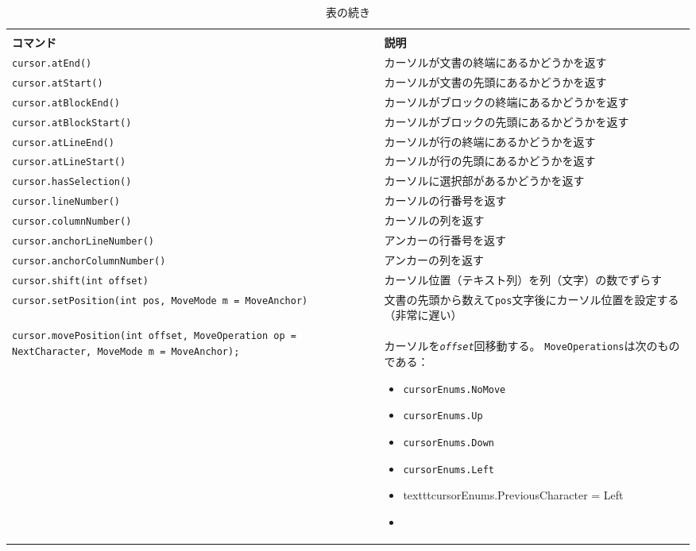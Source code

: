\begin{longtable}{XX}
  \caption{カーソルオブジェクトの一覧}
  \endfirsthead
  \caption{表の続き}
  \endhead
  \hline
  \multicolumn{2}{c}{\textbf{カーソルオブジェクト}}\\
  \textbf{コマンド} & \textbf{説明}\\
  \hline
  \texttt{cursor.atEnd()} & カーソルが文書の終端にあるかどうかを返す\\
  \texttt{cursor.atStart()} & カーソルが文書の先頭にあるかどうかを返す\\
  \texttt{cursor.atBlockEnd()} & カーソルがブロックの終端にあるかどうかを返す\\
  \texttt{cursor.atBlockStart()} & カーソルがブロックの先頭にあるかどうかを返す\\
  \texttt{cursor.atLineEnd()} & カーソルが行の終端にあるかどうかを返す\\
  \texttt{cursor.atLineStart()} & カーソルが行の先頭にあるかどうかを返す\\
  \texttt{cursor.hasSelection()} & カーソルに選択部があるかどうかを返す\\
  \texttt{cursor.lineNumber()} & カーソルの行番号を返す\\
  \texttt{cursor.columnNumber()} & カーソルの列を返す\\
  \texttt{cursor.anchorLineNumber()} & アンカーの行番号を返す\\
  \texttt{cursor.anchorColumnNumber()} & アンカーの列を返す\\
  \texttt{cursor.shift(int offset)}
    & カーソル位置（テキスト列）を列（文字）の数でずらす\\
  \texttt{cursor.setPosition(int pos, MoveMode m = MoveAnchor)}
    & 文書の先頭から数えて\texttt{pos}文字後にカーソル位置を設定する（非常に遅い）\\
  \texttt{cursor.movePosition(int offset, MoveOperation op = NextCharacter, MoveMode m = MoveAnchor);}
    & カーソルを\texttt{\emph{offset}}回移動する。
    \texttt{MoveOperations}は次のものである：
    \begin{itemize}
    \item
      \texttt{cursorEnums.NoMove}
    \item
      \texttt{cursorEnums.Up}
    \item
      \texttt{cursorEnums.Down}
    \item
      \texttt{cursorEnums.Left}
    \item
      texttt{cursorEnums.PreviousCharacter = Left}
    \item

\end{itemize}
\end{longtable}
